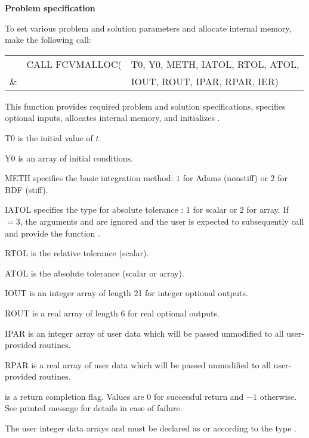 \begin{Steps}
\item {\bf Problem specification}

  To set various problem and solution parameters and allocate
  internal memory, make the following call:
  {
    \begin{tabular}[t]{@{}r@{}l@{}l}
        &CALL FCVMALLOC(&T0, Y0, METH, IATOL, RTOL, ATOL, \\
    {\&}&               &IOUT, ROUT, IPAR, RPAR, IER)
    \end{tabular}
  }
  {
    This function provides required problem and solution specifications, 
    specifies optional inputs,
    allocates internal memory, and initializes {\cvode}.
  }
  {
    \begin{args}[IATOL]
    \item[T0] is the initial value of $t$.
    \item[Y0] is an array of initial conditions.
    \item[METH] specifies the  basic integration method: 
      $1$ for Adams (nonstiff) or $2$ for BDF (stiff).
    \item[IATOL] specifies the type for absolute tolerance :
      $1$ for scalar or $2$ for array. If $=3$, the arguments
       and  are ignored and the user is expected to
      subsequently call  and provide the function .
    \item[RTOL] is the relative tolerance (scalar).
    \item[ATOL] is the absolute tolerance (scalar or array).
    \item[IOUT] is an integer array of length 21 for integer optional outputs.
    \item[ROUT] is a real array of length 6 for real optional outputs.
    \item[IPAR] is an integer array of user data which will be passed
      unmodified to all user-provided routines.
    \item[RPAR] is a real array of user data which will be passed
      unmodified to all user-provided routines.
    \end{args}
  }
  {
     is a return completion flag.  Values are $0$ for successful return
    and $-1$ otherwise. See printed message for details in case of failure.
  }
  {
    The user integer data arrays  and  must be declared as
     or  according to the {\CC} type .

}
\end{Steps}
